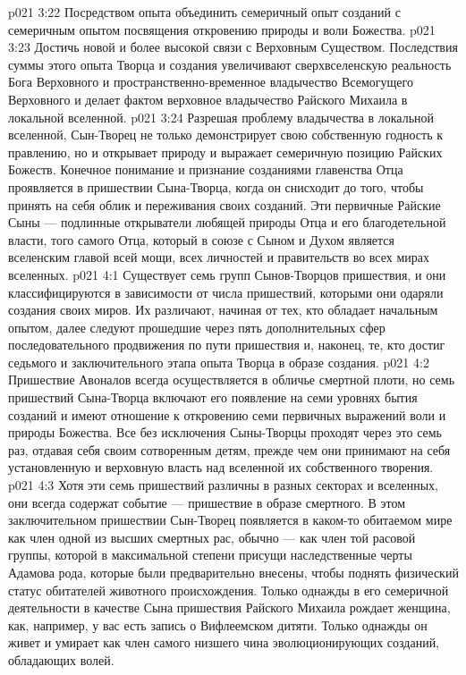 \vs p021 3:22 \pc {}\bibnobreakspace Посредством опыта объединить семеричный опыт созданий с семеричным опытом посвящения откровению природы и воли Божества.
\vs p021 3:23 \pc {}\bibnobreakspace Достичь новой и более высокой связи с Верховным Существом. Последствия суммы этого опыта Творца и создания увеличивают сверхвселенскую реальность Бога Верховного и пространственно\hyp{}временное владычество Всемогущего Верховного и делает фактом верховное владычество Райского Михаила в локальной вселенной.
\vs p021 3:24 \pc Разрешая проблему владычества в локальной вселенной, Сын\hyp{}Творец не только демонстрирует свою собственную годность к правлению, но и открывает природу и выражает семеричную позицию Райских Божеств. Конечное понимание и признание созданиями главенства Отца проявляется в пришествии Сына\hyp{}Творца, когда он снисходит до того, чтобы принять на себя облик и переживания своих созданий. Эти первичные Райские Сыны --- подлинные открыватели любящей природы Отца и его благодетельной власти, того самого Отца, который в союзе с Сыном и Духом является вселенским главой всей мощи, всех личностей и правительств во всех мирах вселенных.
\vs p021 4:1 Существует семь групп Сынов\hyp{}Творцов пришествия, и они классифицируются в зависимости от числа пришествий, которыми они одаряли создания своих миров. Их различают, начиная от тех, кто обладает начальным опытом, далее следуют прошедшие через пять дополнительных сфер последовательного продвижения по пути пришествия и, наконец, те, кто достиг седьмого и заключительного этапа опыта Творца в образе создания.
\vs p021 4:2 Пришествие Авоналов всегда осуществляется в обличье смертной плоти, но семь пришествий Сына\hyp{}Творца включают его появление на семи уровнях бытия созданий и имеют отношение к откровению семи первичных выражений воли и природы Божества. Все без исключения Сыны\hyp{}Творцы проходят через это семь раз, отдавая себя своим сотворенным детям, прежде чем они принимают на себя установленную и верховную власть над вселенной их собственного творения.
\vs p021 4:3 Хотя эти семь пришествий различны в разных секторах и вселенных, они всегда содержат событие --- пришествие в образе смертного. В этом заключительном пришествии Сын\hyp{}Творец появляется в каком\hyp{}то обитаемом мире как член одной из высших смертных рас, обычно --- как член той расовой группы, которой в максимальной степени присущи наследственные черты Адамова рода, которые были предварительно внесены, чтобы поднять физический статус обитателей животного происхождения. Только однажды в его семеричной деятельности в качестве Сына пришествия Райского Михаила рождает женщина, как, например, у вас есть запись о Вифлеемском дитяти. Только однажды он живет и умирает как член самого низшего чина эволюционирующих созданий, обладающих волей.
